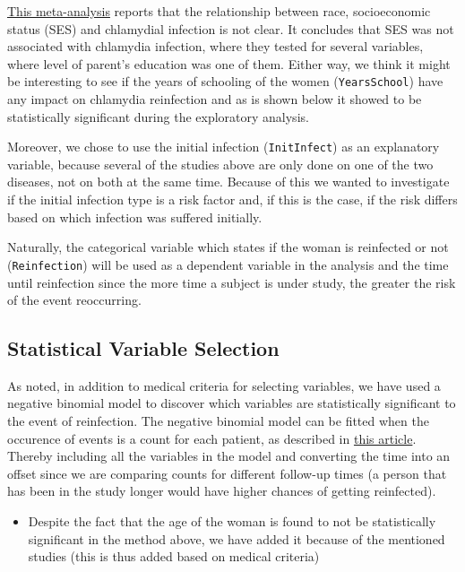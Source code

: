 \documentclass[
]{article}
\providecommand{\tightlist}{%
  \setlength{\itemsep}{0pt}\setlength{\parskip}{0pt}}
\begin{document}
\href{https://www.ncbi.nlm.nih.gov/pmc/articles/PMC2094865/}{This meta-analysis} reports that the relationship between race, socioeconomic status (SES) and chlamydial infection is not clear. It concludes that SES was not associated with chlamydia infection, where they tested for several variables, where level of parent's education was one of them. Either way, we think it might be interesting to see if the years of schooling of the women (\texttt{YearsSchool}) have any impact on chlamydia reinfection and as is shown below it showed to be statistically significant during the exploratory analysis.

Moreover, we chose to use the initial infection (\texttt{InitInfect}) as an explanatory variable, because several of the studies above are only done on one of the two diseases, not on both at the same time. Because of this we wanted to investigate if the initial infection type is a risk factor and, if this is the case, if the risk differs based on which infection was suffered initially.

Naturally, the categorical variable which states if the woman is reinfected or not (\texttt{Reinfection}) will be used as a dependent variable in the analysis and the time until reinfection since the more time a subject is under study, the greater the risk of the event reoccurring.

\hypertarget{statistical-variable-selection}{%
\subsection{Statistical Variable Selection}\label{statistical-variable-selection}}

As noted, in addition to medical criteria for selecting variables, we have used a negative binomial model to discover which variables are statistically significant to the event of reinfection. The negative binomial model can be fitted when the occurence of events is a count for each patient, as described in \href{https://pubmed.ncbi.nlm.nih.gov/22083507/}{this article}. Thereby including all the variables in the model and converting the time into an offset since we are comparing counts for different follow-up times (a person that has been in the study longer would have higher chances of getting reinfected).

\begin{itemize}
\tightlist
\item
  Despite the fact that the age of the woman is found to not be statistically significant in the method above, we have added it because of the mentioned studies (this is thus added based on medical criteria)
\end{itemize}
\end{document}
